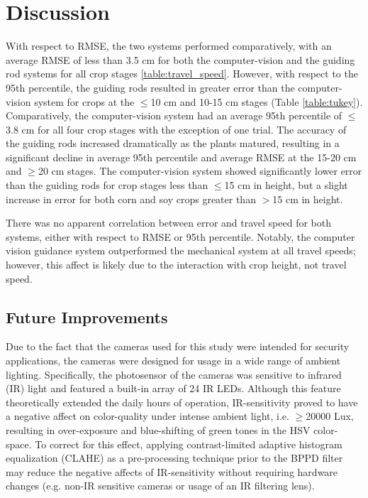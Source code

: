 \documentclass[authoryear]{elsarticle}
\begin{document}

\section{Discussion}
With respect to RMSE, the two systems performed comparatively, with an
average RMSE of less than 3.5 cm for both the computer-vision and the
guiding rod systems for all crop stages
\ref{table:travel_speed}. However, with respect to the 95th
percentile, the guiding rods resulted in greater error than the
computer-vision system for crops at the $\le$10 cm and 10-15 cm stages
(Table \ref{table:tukey}). Comparatively, the computer-vision system
had an average 95th percentile of $\le$3.8 cm for all four crop stages
with the exception of one trial. The accuracy of the guiding rods
increased dramatically as the plants matured, resulting in a
significant decline in average 95th percentile and average RMSE at the
15-20 cm and $\ge$20 cm stages. The computer-vision system showed
significantly lower error than the guiding rods for crop stages less
than $\le$15 cm in height, but a slight increase in error for both
corn and soy crops greater than $>$15 cm in height.

There was no apparent correlation between error and travel speed for
both systems, either with respect to RMSE or 95th percentile. Notably,
the computer vision guidance system outperformed the mechanical system
at all travel speeds; however, this affect is likely due to the
interaction with crop height, not travel speed.

\subsection{Future Improvements}
Due to the fact that the cameras used for this study were intended for
security applications, the cameras were designed for usage in a wide
range of ambient lighting. Specifically, the photosensor of the
cameras was sensitive to infrared (IR) light and featured a built-in
array of 24 IR LEDs. Although this feature theoretically extended the
daily hours of operation, IR-sensitivity proved to have a negative
affect on color-quality under intense ambient light, i.e. $\ge$20000
Lux, resulting in over-exposure and blue-shifting of green tones in
the HSV color-space. To correct for this effect, applying
contrast-limited adaptive histogram equalization (CLAHE) as a
pre-processing technique prior to the BPPD filter may reduce the
negative affects of IR-sensitivity without requiring hardware changes
(e.g. non-IR sensitive cameras or usage of an IR filtering lens).
\end{document}
